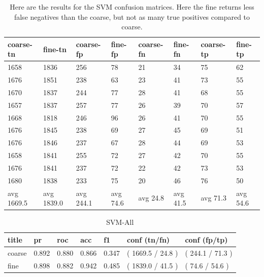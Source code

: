 \documentclass[ms]{nuthesis}
\begin{document}
\FloatBarrier
\begin{table}[H]
  \centering
  \begin{tabular}{|l||l||l||l||l||l||l||l|}\toprule
    coarse-tn & fine-tn & coarse-fp & fine-fp & coarse-fn & fine-fn & coarse-tp & fine-tp \\ \midrule
    1658 & 1836 & 256 & 78 & 21 & 34 & 75 & 62 \\
    1676 & 1851 & 238 & 63 & 23 & 41 & 73 & 55 \\
    1670 & 1837 & 244 & 77 & 28 & 41 & 68 & 55 \\
    1657 & 1837 & 257 & 77 & 26 & 39 & 70 & 57 \\
    1668 & 1818 & 246 & 96 & 26 & 41 & 70 & 55 \\
    1676 & 1845 & 238 & 69 & 27 & 45 & 69 & 51 \\
    1676 & 1846 & 237 & 67 & 28 & 44 & 69 & 53 \\
    1658 & 1841 & 255 & 72 & 27 & 42 & 70 & 55 \\
    1676 & 1841 & 237 & 72 & 22 & 42 & 73 & 53 \\
    1680 & 1838 & 233 & 75 & 20 & 46 & 76 & 50 \\
    avg 1669.5 & avg 1839.0 & avg 244.1 & avg 74.6 & avg 24.8 & avg 41.5 & avg 71.3 & avg 54.6 \\ \bottomrule
  \end{tabular}
  \caption{Here are the results for the SVM confusion matrices. Here the fine returns less false negatives
  than the coarse, but not as many true positives compared to coarse.}
  \label{tab:SVM}
\end{table}
\FloatBarrier

\FloatBarrier
\begin{table}[H]
\centering
\begin{tabular}{|l||l||l||l||l||l||l|}\toprule
title & pr & roc & acc & f1 & conf (tn/fn) & conf (fp/tp) \\ \midrule
coarse & 0.892 & 0.880 & 0.866 & 0.347 & ( 1669.5 / 24.8 ) & ( 244.1 / 71.3 ) \\
fine & 0.898 & 0.882 & 0.942 & 0.485 & ( 1839.0 / 41.5 ) & ( 74.6 / 54.6 ) \\ \bottomrule
\end{tabular}
\caption{SVM-All}
\label{tab:SVM-All}
\end{table}
\FloatBarrier
\end{document}
